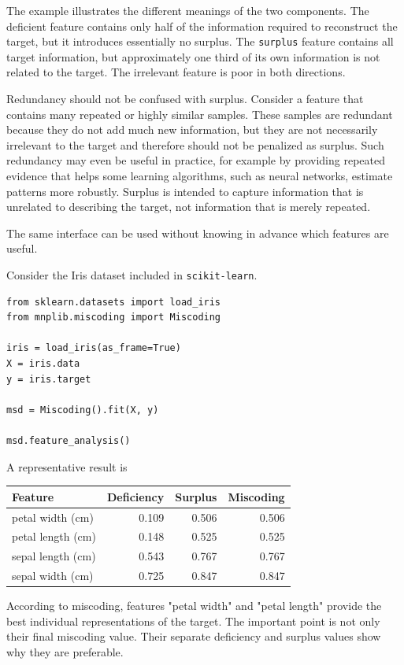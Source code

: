 \begin{example}
The example illustrates the different meanings of the two components. The deficient feature contains only half of the information required to reconstruct the target, but it introduces essentially no surplus. The \texttt{surplus} feature contains all target information, but approximately one third of its own information is not related to the target. The irrelevant feature is poor in both directions.

\end{example}

Redundancy should not be confused with surplus. Consider a feature that contains many repeated or highly similar samples. These samples are redundant because they do not add much new information, but they are not necessarily irrelevant to the target and therefore should not be penalized as surplus. Such redundancy may even be useful in practice, for example by providing repeated evidence that helps some learning algorithms, such as neural networks, estimate patterns more robustly. Surplus is intended to capture information that is unrelated to describing the target, not information that is merely repeated.

The same interface can be used without knowing in advance which features are useful.

\begin{example}
Consider the Iris dataset included in \texttt{scikit-learn}.

\begin{sourcecode}
{\scriptsize \begin{verbatim}
from sklearn.datasets import load_iris
from mnplib.miscoding import Miscoding

iris = load_iris(as_frame=True)
X = iris.data
y = iris.target

msd = Miscoding().fit(X, y)

msd.feature_analysis()
\end{verbatim}}
\end{sourcecode}

A representative result is

\begin{center}
\begin{tabular}{lrrr}
\hline
Feature & Deficiency & Surplus & Miscoding \\
\hline
petal width (cm)  & 0.109 & 0.506 & 0.506 \\
petal length (cm) & 0.148 & 0.525 & 0.525 \\
sepal length (cm) & 0.543 & 0.767 & 0.767 \\
sepal width (cm)  & 0.725 & 0.847 & 0.847 \\
\hline
\end{tabular}
\end{center}

According to miscoding, features "petal width" and "petal length" provide the best individual representations of the target. The important point is not only their final miscoding value. Their separate deficiency and surplus values show why they are preferable.
\end{example}

